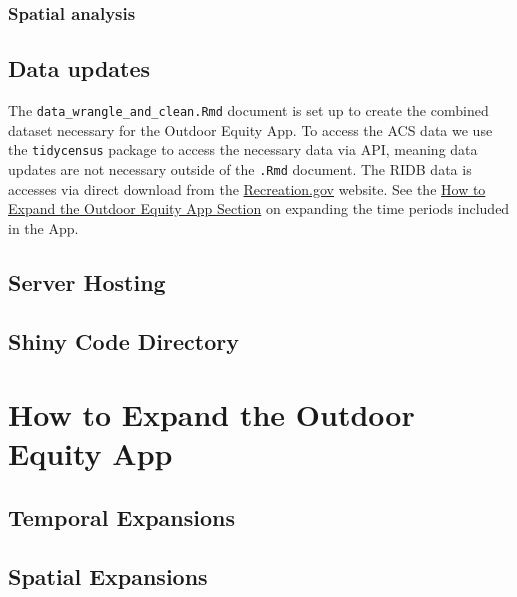 \documentclass[
]{book}
\begin{document}
\hypertarget{spatial-analysis}{%
\subsubsection{Spatial analysis}\label{spatial-analysis}}

\hypertarget{data-updates}{%
\subsection{Data updates}\label{data-updates}}

The \texttt{data\_wrangle\_and\_clean.Rmd} document is set up to create the combined dataset necessary for the Outdoor Equity App. To access the ACS data we use the \texttt{tidycensus} package \citep{R-tidycensus} to access the necessary data via API, meaning data updates are not necessary outside of the \texttt{.Rmd} document. The RIDB data is accesses via direct download from the \href{https://ridb.recreation.gov/download}{Recreation.gov} website. See the \protect\hyperlink{how-to-expand-the-outdoor-equity-app}{How to Expand the Outdoor Equity App Section} on expanding the time periods included in the App.

\hypertarget{server-hosting}{%
\subsection{Server Hosting}\label{server-hosting}}

\hypertarget{shiny-code-directory}{%
\subsection{Shiny Code Directory}\label{shiny-code-directory}}

\hypertarget{how-to-expand-the-outdoor-equity-app}{%
\section{How to Expand the Outdoor Equity App}\label{how-to-expand-the-outdoor-equity-app}}

\hypertarget{temporal-expansions}{%
\subsection{Temporal Expansions}\label{temporal-expansions}}

\hypertarget{spatial-expansions}{%
\subsection{Spatial Expansions}\label{spatial-expansions}}
\end{document}
